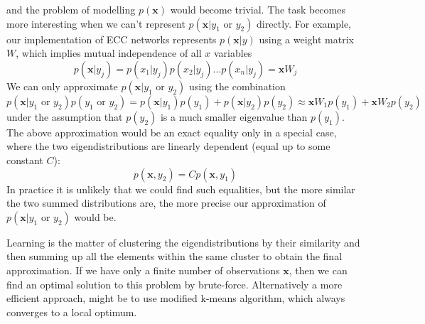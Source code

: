 \documentclass[12pt]{article}
\begin{document}
and the problem of modelling $p(\boldsymbol{x})$ would become trivial. The task becomes more interesting when we can't represent  $p(\boldsymbol{x}|y_1\text{ or }y_2)$ directly. For example, our implementation of ECC networks represents $p(\boldsymbol{x}|y)$ using a weight matrix $W$, which implies mutual independence of all $x$ variables
\[
p(\boldsymbol{x}|y_j) = p(x_1|y_j)p(x_2|y_j)...p(x_n|y_j) = \boldsymbol{x} W_j
\]
We can only approximate $p(\boldsymbol{x}|y_1\text{ or }y_2)$
using the combination
\[
p(\boldsymbol{x}|y_1\text{ or }y_2) p(y_1\text{ or }y_2)= p(\boldsymbol{x}|y_1) p(y_1)+p(\boldsymbol{x}|y_2) p(y_2) \approx \boldsymbol{x}W_1p(y_1) + \boldsymbol{x}W_2 p(y_2)
\]
under the assumption that $p(y_2)$ is a much smaller eigenvalue than $p(y_1)$.
The above approximation would be an exact equality only in a special case, where the two eigendistributions are linearly dependent (equal up to some constant $C$):
\[p(\boldsymbol{x},y_2)=C p(\boldsymbol{x},y_1)\]
In practice it is unlikely that we could find such equalities, but the more similar the two summed distributions are, the more precise our approximation of $p(\boldsymbol{x}|y_1\text{ or }y_2)$ would be. 

Learning is the matter of clustering the eigendistributions by their similarity and then summing up all the elements within the same cluster to obtain the final approximation. If we have only a finite number of observations $\boldsymbol{x}$, then we can find an optimal solution to this problem by brute-force. Alternatively a more efficient approach, might be to use modified k-means algorithm, which always converges to a local optimum. 
\end{document}
